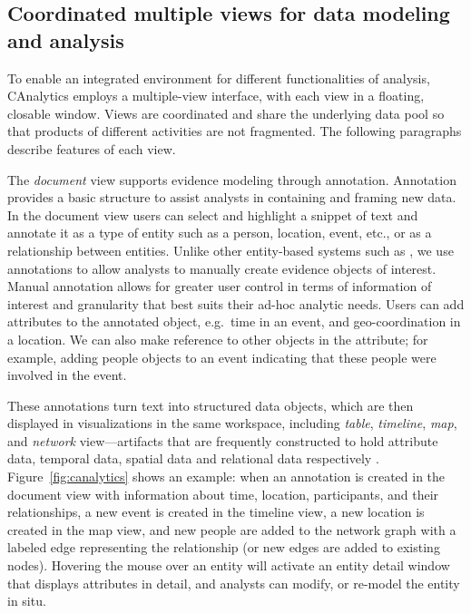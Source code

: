 \subsection{Coordinated multiple views for data modeling and analysis}

To enable an integrated environment for different functionalities of analysis, CAnalytics employs a multiple-view interface, with each view in a floating, closable window. Views are coordinated and share the underlying data pool so that products of different activities are not fragmented. The following paragraphs describe features of each view.

The \emph{document} view supports evidence modeling through annotation. Annotation provides a basic structure to assist analysts in containing and framing new data. In the
document view users can select and highlight a snippet of text and
annotate it as a type of entity such as a person, location, event, etc.,
or as a relationship between entities. Unlike other entity-based
systems such as \cite{Bier2010,Stasko2008}, we use annotations to
allow analysts to manually create evidence objects of interest. Manual
annotation allows for greater user control in terms of
information of interest and granularity that best suits their ad-hoc
analytic needs.
Users can add attributes to the annotated object, e.g.~time in an event, and geo-coordination in a location. We can
also make reference to other objects in the attribute; for example,
adding people objects to an event indicating that these people
were involved in the event.

These annotations turn text into structured data objects, which are then displayed in visualizations in the same workspace, including \emph{table}, \emph{timeline}, \emph{map},
and \emph{network} view---artifacts that are frequently constructed to hold attribute
data, temporal data, spatial data and relational data respectively
\cite{Carroll2013}. Figure~\ref{fig:canalytics} shows an example:
when an annotation is created in the document view with information
about time, location, participants, and their relationships, a new event
is created in the timeline view, a new location is created in the map
view, and new people are added to the network graph with a labeled edge
representing the relationship (or new edges are added to existing
nodes). Hovering the mouse over an entity will activate an entity detail
window that displays attributes in detail, and analysts can modify, or
re-model the entity in situ.

